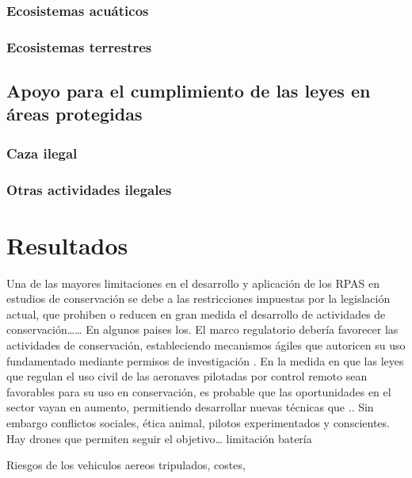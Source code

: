 \documentclass[11pt,]{article}
\begin{document}
\subsubsection{Ecosistemas acuáticos}\label{ecosistemas-acuaticos}

\subsubsection{Ecosistemas terrestres}\label{ecosistemas-terrestres}

\subsection{Apoyo para el cumplimiento de las leyes en áreas
protegidas}\label{apoyo-para-el-cumplimiento-de-las-leyes-en-areas-protegidas}

\subsubsection{Caza ilegal}\label{caza-ilegal}

\subsubsection{Otras actividades
ilegales}\label{otras-actividades-ilegales}

\section{Resultados}\label{resultados}

Una de las mayores limitaciones en el desarrollo y aplicación de los
RPAS en estudios de conservación se debe a las restricciones impuestas
por la legislación actual, que prohiben o reducen en gran medida el
desarrollo de actividades de conservación\ldots{}\ldots{} En algunos
paises los. El marco regulatorio debería favorecer las actividades de
conservación, estableciendo mecanismos ágiles que autoricen su uso
fundamentado mediante permisos de investigación . En la medida en que
las leyes que regulan el uso civil de las aeronaves pilotadas por
control remoto sean favorables para su uso en conservación, es probable
que las oportunidades en el sector vayan en aumento, permitiendo
desarrollar nuevas técnicas que .. Sin embargo conflictos sociales,
ética animal, pilotos experimentados y conscientes. Hay drones que
permiten seguir el objetivo\ldots{} limitación batería

Riesgos de los vehiculos aereos tripulados, costes,
\end{document}
